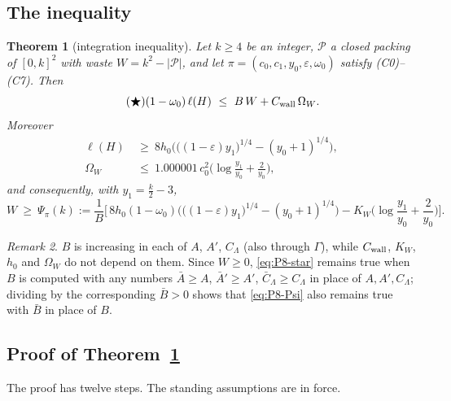\documentclass[11pt]{amsart}
\newcommand{\eps}{\varepsilon}
\newcommand{\cP}{\mathcal P}
\newcommand{\Lam}{\Lambda}
\newtheorem{theorem}{Theorem}[section]
\theoremstyle{definition}
\theoremstyle{remark}
\newtheorem{remark}[theorem]{Remark}
\numberwithin{equation}{section}
\begin{document}
\subsection{The inequality}\label{subsec:P8-thm}

\begin{theorem}[integration inequality]\label{thm:star}
Let $k\ge4$ be an integer, $\cP$ a closed packing of $[0,k]^2$ with waste $W=k^2-|\cP|$, and let
$\pi=(c_0,c_1,y_0,\eps,\omega_0)$ satisfy \textup{(C0)--(C7)}. Then
\begin{equation}\label{eq:P8-star}\tag{$\bigstar$}
(1-\omega_0)\,\ell(H)\ \le\ B\,W+C_{\rm wall}\,\Omega_W .
\end{equation}
Moreover
\begin{align}
\ell(H)&\ \ge\ 8h_0\Big(\big((1-\eps)y_1\big)^{1/4}-(y_0+1)^{1/4}\Big),\label{eq:P8-lH}\\
\Omega_W&\ \le\ 1.000001\,c_0^2\Big(\log\frac{y_1}{y_0}+\frac2{y_0}\Big),\label{eq:P8-Om}
\end{align}
and consequently, with $y_1=\frac k2-3$,
\begin{equation}\label{eq:P8-Psi}
W\ \ge\ \Psi_\pi(k):=\frac1B\Big[\,8h_0(1-\omega_0)\Big(\big((1-\eps)y_1\big)^{1/4}-(y_0+1)^{1/4}\Big)
-K_W\Big(\log\frac{y_1}{y_0}+\frac2{y_0}\Big)\Big].
\end{equation}
\end{theorem}

\begin{remark}\label{rem:P8-larger}
$B$ is increasing in each of $A$, $A'$, $C_\Lam$ (also through $\Gamma$), while $C_{\rm wall}$, $K_W$, $h_0$ and
$\Omega_W$ do not depend on them. Since $W\ge0$, \eqref{eq:P8-star} remains true when $B$ is computed with any
numbers $\bar A\ge A$, $\bar A'\ge A'$, $\bar C_\Lam\ge C_\Lam$ in place of $A,A',C_\Lam$; dividing by the
corresponding $\bar B>0$ shows that \eqref{eq:P8-Psi} also remains true with $\bar B$ in place of $B$.
\end{remark}

\subsection{Proof of Theorem~\ref{thm:star}}\label{subsec:P8-proof}

The proof has twelve steps. The standing assumptions are in force.
\end{document}
